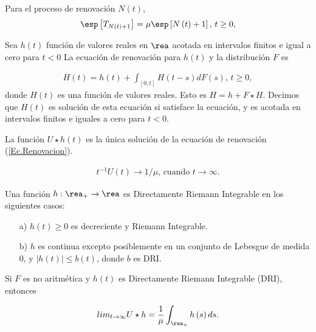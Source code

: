 \begin{Coro}
Para el proceso de renovaci\'on $N\left(t\right)$,
\begin{eqnarray*}
\esp\left[T_{N\left(t\right)+1}\right]=\mu\esp\left[N\left(t\right)+1\right]\textrm{,  }t\geq0,
\end{eqnarray*}  
\end{Coro}


\begin{Def}
Sea $h\left(t\right)$ funci\'on de valores reales en $\rea$ acotada en intervalos finitos e igual a cero para $t<0$ La ecuaci\'on de renovaci\'on para $h\left(t\right)$ y la distribuci\'on $F$ es

\begin{eqnarray}\label{Ec.Renovacion}
H\left(t\right)=h\left(t\right)+\int_{\left[0,t\right]}H\left(t-s\right)dF\left(s\right)\textrm{,    }t\geq0,
\end{eqnarray}
donde $H\left(t\right)$ es una funci\'on de valores reales. Esto es $H=h+F\star H$. Decimos que $H\left(t\right)$ es soluci\'on de esta ecuaci\'on si satisface la ecuaci\'on, y es acotada en intervalos finitos e iguales a cero para $t<0$.
\end{Def}

\begin{Prop}
La funci\'on $U\star h\left(t\right)$ es la \'unica soluci\'on de la ecuaci\'on de renovaci\'on (\ref{Ec.Renovacion}).
\end{Prop}

\begin{Teo}
\begin{eqnarray*}
t^{-1}U\left(t\right)\rightarrow 1/\mu\textrm{,    cuando }t\rightarrow\infty.
\end{eqnarray*}
\end{Teo}


\begin{Note} Una funci\'on $h:\rea_{+}\rightarrow\rea$ es Directamente Riemann Integrable en los siguientes casos:
\begin{itemize}
\item[a)] $h\left(t\right)\geq0$ es decreciente y Riemann Integrable.
\item[b)] $h$ es continua excepto posiblemente en un conjunto de Lebesgue de medida 0, y $|h\left(t\right)|\leq b\left(t\right)$, donde $b$ es DRI.
\end{itemize}
\end{Note}

\begin{Teo}
Si $F$ es no aritm\'etica y $h\left(t\right)$ es Directamente Riemann Integrable (DRI), entonces

\begin{eqnarray*}
lim_{t\rightarrow\infty}U\star h=\frac{1}{\mu}\int_{\rea_{+}}h\left(s\right)ds.
\end{eqnarray*}
\end{Teo}

